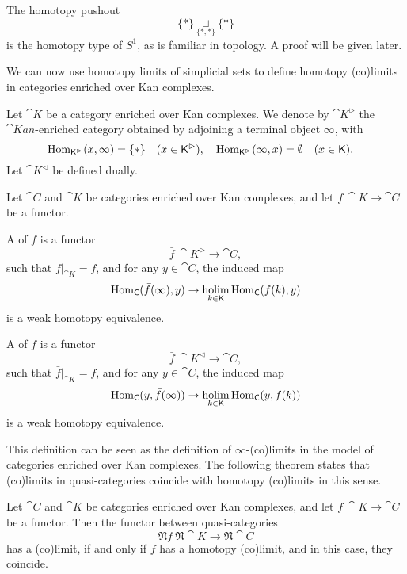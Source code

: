 \begin{example}
    The homotopy pushout
    \[ \{*\}\underset{\{*,*\}}{\sqcup}\{*\} \]
    is the homotopy type of $S^1$, as is familiar in topology.
    A proof will be given later.
    \varqed
\end{example}

We can now use homotopy limits of simplicial sets 
to define homotopy (co)limits in categories enriched over Kan complexes.

Let $\cat K$ be a category enriched over Kan complexes.
We denote by $\cat K^\vartriangleright$ the $\cat{Kan}$-enriched category obtained
by adjoining a terminal object $\infty$, with 
\[ \operatorname{Hom}_{\mathsf{K}^\vartriangleright}(x,\infty)=\{*\}\quad(x\in\mathsf{K}^\vartriangleright),\quad
\operatorname{Hom}_{\mathsf{K}^\vartriangleright}(\infty,x)=\emptyset\quad(x\in\mathsf{K}).\quad  \]
Let $\cat K^\vartriangleleft$ be defined dually.

\begin{definition}
    Let $\cat C$ and $\cat K$ be categories enriched over Kan complexes,
    and let $f\:\cat K\to\cat C$ be a functor.
    \begin{itms}
        \item A  of $f$ is a functor 
        \[ \bar f\:\cat K^\vartriangleright\to\cat C, \]
        such that $\bar f|_{\cat K}=f$, and for any $y\in\cat C$, the induced map 
        \[ \operatorname{Hom}_{\mathsf{C}}(\bar f(\infty),y)\to\mathop{\operatorname{holim}}\limits_{k\in\mathsf{K}}\operatorname{Hom}_{\mathsf{C}}(f(k),y) \]
        is a weak homotopy equivalence.

        \item A  of $f$ is a functor 
        \[ \bar f\:\cat K^\vartriangleleft\to\cat C, \]
        such that $\bar f|_{\cat K}=f$, and for any $y\in\cat C$, the induced map 
        \[ \operatorname{Hom}_{\mathsf{C}}(y,\bar f(\infty))\to\mathop{\operatorname{holim}}\limits_{k\in\mathsf{K}}\operatorname{Hom}_{\mathsf{C}}(y,f(k)) \]
        is a weak homotopy equivalence.
    \end{itms}
\end{definition}

This definition can be seen as the definition of $\infty$-(co)limits 
in the model of categories enriched over Kan complexes.
The following theorem states that
(co)limits in quasi-categories coincide with homotopy (co)limits in this sense.

\begin{theorem}
    Let $\cat C$ and $\cat K$ be categories enriched over Kan complexes,
    and let $f\:\cat K\to\cat C$ be a functor.
    Then the functor between quasi-categories
    \[ \mathfrak Nf\:\mathfrak N\cat K\to\mathfrak N\cat C \]
    has a (co)limit,
    if and only if $f$ has a homotopy (co)limit,
    and in this case, they coincide.
\end{theorem}

